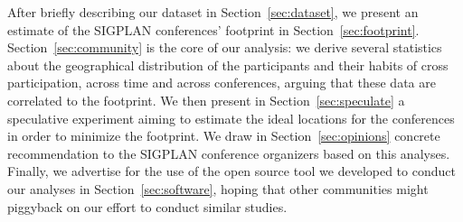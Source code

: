 After briefly describing our dataset in Section~\ref{sec:dataset}, we
present an estimate of the SIGPLAN conferences' footprint in
Section~\ref{sec:footprint}.  Section~\ref{sec:community} is the core of our
analysis: we derive several statistics about the geographical distribution
of the participants and their habits of cross participation, across time and
across conferences, arguing that these data are correlated to the footprint.
We then present in Section~\ref{sec:speculate} a speculative experiment
aiming to estimate the ideal locations for the conferences in order to
minimize the footprint.  \ifopinions We draw in Section~\ref{sec:opinions}
concrete recommendation to the SIGPLAN conference organizers based on this
analyses.  \fi Finally, we advertise for the use of the open source tool we
developed to conduct our analyses in Section~\ref{sec:software}, hoping that
other communities might piggyback on our effort to conduct similar studies.


